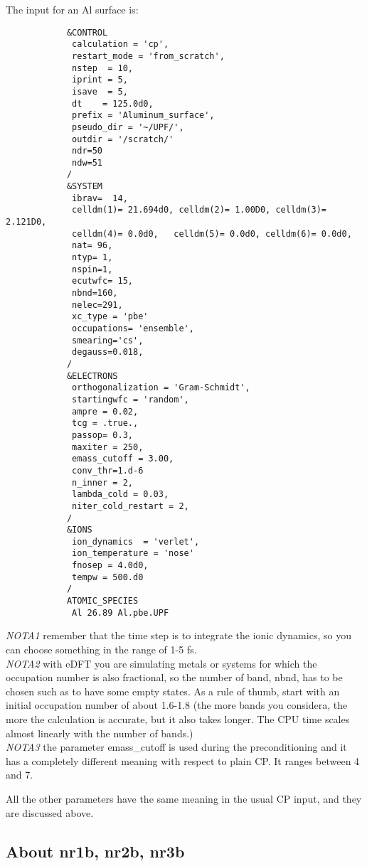 \documentclass[12pt,a4paper]{article}
\begin{document}
The input for an Al surface is:
\begin{verbatim}
            &CONTROL
             calculation = 'cp',
             restart_mode = 'from_scratch',
             nstep  = 10,
             iprint = 5,
             isave  = 5,
             dt    = 125.0d0,
             prefix = 'Aluminum_surface',
             pseudo_dir = '~/UPF/',
             outdir = '/scratch/'
             ndr=50
             ndw=51
            /
            &SYSTEM
             ibrav=  14,
             celldm(1)= 21.694d0, celldm(2)= 1.00D0, celldm(3)= 2.121D0,
             celldm(4)= 0.0d0,   celldm(5)= 0.0d0, celldm(6)= 0.0d0,
             nat= 96,
             ntyp= 1,
             nspin=1,
             ecutwfc= 15,
             nbnd=160,
             nelec=291,
             xc_type = 'pbe'
             occupations= 'ensemble',
             smearing='cs',
             degauss=0.018,
            /
            &ELECTRONS
             orthogonalization = 'Gram-Schmidt',
             startingwfc = 'random',
             ampre = 0.02,
             tcg = .true.,
             passop= 0.3,
             maxiter = 250,
             emass_cutoff = 3.00,
             conv_thr=1.d-6
             n_inner = 2,
             lambda_cold = 0.03,
             niter_cold_restart = 2,
            /
            &IONS
             ion_dynamics  = 'verlet',
             ion_temperature = 'nose'
             fnosep = 4.0d0,
             tempw = 500.d0
            /
            ATOMIC_SPECIES
             Al 26.89 Al.pbe.UPF
\end{verbatim}
{\em NOTA1}  remember that the time step is to integrate the ionic dynamics,
so you can choose something in the range of 1-5 fs. \\
{\em NOTA2} with eDFT you are simulating metals or systems for which the 
occupation number is also fractional, so the number of band, nbnd, has to 
be chosen such as to have some empty states. As a rule of thumb, start
with an initial occupation number of about 1.6-1.8 (the more bands you 
considera, the more the calculation is accurate, but it also takes longer.
The CPU time scales almost linearly with the number of bands.) \\
{\em NOTA3} the parameter emass\_cutoff is used during the preconditioning 
and it has a completely different meaning with respect to plain CP. 
It ranges between 4 and 7.

All the other parameters have the same meaning in the usual CP input, 
and they are discussed above.

\subsection{ About nr1b, nr2b, nr3b}
\end{document}

